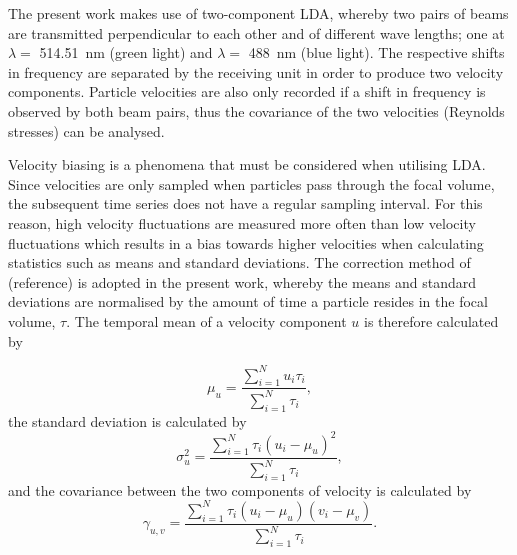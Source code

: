 \documentclass[12pt,oneside,a4paper]{article}
\begin{document}
The present work makes use of two-component LDA, whereby two pairs of beams are transmitted perpendicular to each other and of different wave lengths; one at $\lambda = $ \SI{514.51}{nm} (green light) and $\lambda = $ \SI{488}{nm} (blue light). The respective shifts in frequency are separated by the receiving unit in order to produce two velocity components. Particle velocities are also only recorded if a shift in frequency is observed by both beam pairs, thus the covariance of the two velocities (Reynolds stresses) can be analysed. 

Velocity biasing is a phenomena that must be considered when utilising LDA. Since velocities are only sampled when particles pass through the focal volume, the subsequent time series does not have a regular sampling interval. For this reason, high velocity fluctuations are measured more often than low velocity fluctuations which results in a bias towards higher velocities when calculating statistics such as means and standard deviations. The correction method of (reference) is adopted in the present work, whereby the means and standard deviations are normalised by the amount of time a particle resides in the focal volume, $\tau$. The temporal mean of a velocity component $u$ is therefore calculated by

\begin{equation}
\mu_u = \frac{\sum^N_{i=1} u_i \tau_i}{\sum^N_{i=1} \tau_i}, 
\end{equation}
the standard deviation is calculated by
\begin{equation}
\sigma_u^2 = \frac{\sum^N_{i=1} \tau_i (u_i - \mu_u)^2}{\sum^N_{i=1} \tau_i},
\end{equation}
and the covariance between the two components of velocity is calculated by
\begin{equation}
\gamma_{u,v} = \frac{\sum^N_{i=1} \tau_i (u_i - \mu_u)(v_i - \mu_v)}{\sum^N_{i=1} \tau_i}.
\end{equation}
\end{document}
